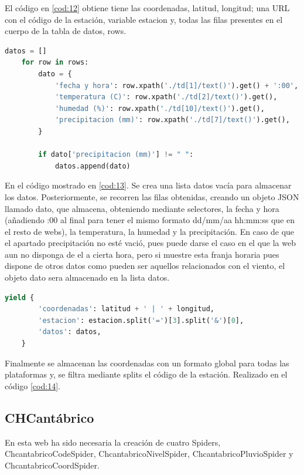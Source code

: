 El código en \ref{cod:12} obtiene tiene las coordenadas, latitud, longitud; una URL con el código de la estación, variable estacion y, todas las filas presentes en el cuerpo de la tabla de datos, rows.

\begin{lstlisting}[language=Python, caption={Trabajar sobre los datos de Aemet Data Spider}, label=cod:13]
	datos = []
	for row in rows:
		dato = {
			'fecha y hora': row.xpath('./td[1]/text()').get() + ':00',
			'temperatura (C)': row.xpath('./td[2]/text()').get(),
			'humedad (%)': row.xpath('./td[10]/text()').get(),
			'precipitacion (mm)': row.xpath('./td[7]/text()').get(),
		}
		
		if dato['precipitacion (mm)'] != " ":
			datos.append(dato)
\end{lstlisting}

En el código mostrado en \ref{cod:13}. Se crea una lista datos vacía para almacenar los datos. Posteriormente, se recorren las filas obtenidas, creando un objeto JSON llamado dato, que almacena, obteniendo mediante selectores, la fecha y hora (añadiendo :00 al final para tener el mismo formato dd/mm/aa hh:mm:ss que en el resto de webs), la temperatura, la humedad y la precipitación.\newline
\newline
En caso de que el apartado precipitación no esté vació, pues puede darse el caso en el que la web aun no disponga de el a cierta hora, pero si muestre esta franja horaria pues dispone de otros datos como pueden ser aquellos relacionados con el viento, el objeto dato sera almacenado en la lista datos.

\begin{lstlisting}[language=Python, caption={Guardado de datos de Aemet Data Spider}, label=cod:14]
	yield {
		'coordenadas': latitud + ' | ' + longitud,
		'estacion': estacion.split('=')[3].split('&')[0],
		'datos': datos,
	}
\end{lstlisting}

Finalmente se almacenan las coordenadas con un formato global para todas las plataformas y, se filtra mediante splits el código de la estación. Realizado en el código \ref{cod:14}.

\subsection{CHCantábrico}
En esta web ha sido necesaria la creación de cuatro Spiders, ChcantabricoCodeSpider, ChcantabricoNivelSpider, ChcantabricoPluvioSpider y ChcantabricoCoordSpider.

